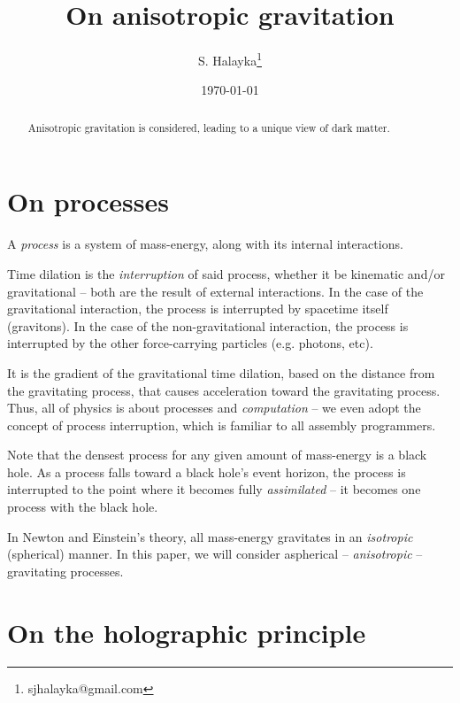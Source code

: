 \documentclass[12pt]{article}
\title{On anisotropic gravitation}
\author{S. Halayka\footnote{sjhalayka@gmail.com}}
\date{\today}
\begin{document}
 
\maketitle

\begin{abstract}
Anisotropic gravitation is considered, leading to a unique view of dark matter.
\end{abstract}






\section{On processes}

A {\textit{process}} is a system of mass-energy, along with its internal interactions.

Time dilation is the {\textit{interruption}} of said process, whether it be kinematic and/or gravitational -- both are the result of external interactions.
In the case of the gravitational interaction, the process is interrupted by spacetime itself (gravitons).
In the case of the non-gravitational interaction, the process is interrupted by the other force-carrying particles (e.g. photons, etc).

It is the gradient of the gravitational time dilation, based on the distance from the gravitating process, that causes acceleration toward the gravitating process.
Thus, all of physics is about processes and {\textit{computation}} -- we even adopt the concept of process interruption, which is familiar to all assembly programmers.

Note that the densest process for any given amount of mass-energy is a black hole.
As a process falls toward a black hole's event horizon, the process is interrupted to the point where it becomes fully {\textit{assimilated}} -- it becomes one process with the black hole.

In Newton and Einstein's theory, all mass-energy gravitates in an {\textit{isotropic}} (spherical) manner.
In this paper, we will consider aspherical -- {\textit{anisotropic}} -- gravitating processes.


\section{On the holographic principle}
\end{document}
